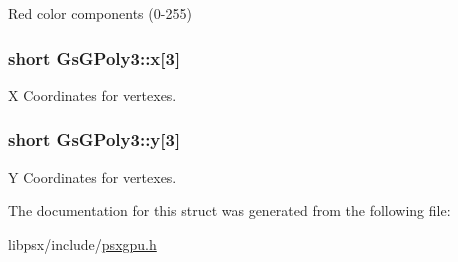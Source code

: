 Red color components (0-\/255) 

\hypertarget{structGsGPoly3_aa88c14cf01a721462df4032ea1daa1b6}{}
\subsubsection[{x}]{\setlength{\rightskip}{0pt plus 5cm}short Gs\+G\+Poly3\+::x\mbox{[}3\mbox{]}}\label{structGsGPoly3_aa88c14cf01a721462df4032ea1daa1b6}


X Coordinates for vertexes. 

\hypertarget{structGsGPoly3_aff8727e5b3a6d62fd51e0e62a214fb58}{}
\subsubsection[{y}]{\setlength{\rightskip}{0pt plus 5cm}short Gs\+G\+Poly3\+::y\mbox{[}3\mbox{]}}\label{structGsGPoly3_aff8727e5b3a6d62fd51e0e62a214fb58}


Y Coordinates for vertexes. 



The documentation for this struct was generated from the following file\+:\begin{DoxyCompactItemize}
\item 
libpsx/include/\hyperlink{psxgpu_8h}{psxgpu.\+h}\end{DoxyCompactItemize}
